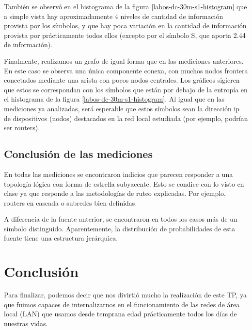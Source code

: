 \documentclass[final,inline,a4paper,narroweqnarray]{ieee}
\begin{document}
  También se observó en el histograma de la figura
  \ref{labos-dc-30m-s1-histogram} que a simple vista hay
  aproximadamente 4 niveles de cantidad de información provista por
  los símbolos, y que hay poca variación en la cantidad de información
  provista por prácticamente todos ellos (excepto por el símbolo S,
  que aporta 2.44 de información).

  Finalmente, realizamos un grafo de igual forma que en las mediciones
  anteriores. En este caso se observa una única componente conexa, con
  muchos nodos frontera conectados mediante una arista con pocos nodos
  centrales. Los gráficos sigieren que estos se correspondan con los
  símbolos que están por debajo de la entropía en el histograma de la
  figura \ref{labos-dc-30m-s1-histogram}. Al igual que en las
  mediciones ya analizadas, será esperable que estos símbolos sean la
  dirección ip de dispositivos (nodos) destacados en la red local
  estudiada (por ejemplo, podrían ser routers).

  \subsection{Conclusión de las mediciones}

  En todas las mediciones se encontraron indicios que parecen responder a una topología lógica con forma de estrella subyacente. Esto se condice con lo visto en clase ya que responde a las metodologías de ruteo explicadas. Por ejemplo, routers en cascada o subredes bien definidas.

  A diferencia de la fuente anterior, se encontraron en todos los casos más de un símbolo distinguido. Aparentemente, la distribución de probabilidades de esta fuente tiene una estructura jerárquica.

\newpage
\section{Conclusión}

Para finalizar, podemos decir que nos divirtió mucho
la realización de este TP, ya que fuimos capaces de
internalizarnos en el funcionamiento de las redes de
área local (LAN) que usamos desde temprana edad
prácticamente todos los días de nuestras vidas.
\end{document}
